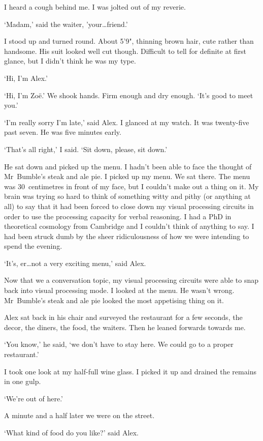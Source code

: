 I heard a cough behind me. I was jolted out of my reverie.

`Madam,' said the waiter, 'your\dots {\twelveit friend}.'

I stood up and turned round. About 5'9", thinning brown hair, cute
rather than handsome. His suit looked well cut though. Difficult to tell for definite at first glance, but I didn't think he was my type.

`Hi, I'm Alex.'

`Hi, I'm Zoë.' We shook hands. Firm enough and dry enough. `It's good to meet you.'

`I'm really sorry I'm late,' said Alex. I glanced at my watch. It was
twenty-five past seven. He was five minutes early.

`That's all right,' I said. `Sit down, please, sit down.'

He sat down and picked up the menu. I hadn't been able to face the thought of Mr~Bumble's steak
and ale pie. I picked up my menu. We sat there. The menu was 30~centimetres in front
of my face, but I couldn't make out a thing on it. My brain
was trying so hard to think of something witty and pithy (or anything at all) to say that it had been
forced to close down my visual processing circuits in order to use
the processing capacity for verbal reasoning. I had a PhD in theoretical cosmology from Cambridge
and I couldn't think of anything to say. I had been struck dumb by the sheer ridiculousness of how we were intending to spend the evening.

`It's, er\dots not a very exciting menu,' said Alex.

Now that we a conversation topic, my visual processing circuits
were able to snap back into visual processing mode. I looked at the menu. He
wasn't wrong. Mr~Bumble's steak and ale pie looked the most
appetising thing on it.

Alex sat back in his chair and surveyed the restaurant for a few
seconds, the decor, the diners, the food, the waiters. Then he
leaned forwards towards me.

`You know,' he said, `we don't have to stay here. We could go to a
proper restaurant.'

I took one look at my half-full wine glass. I picked it up and
drained the remains in one gulp.

`We're out of here.'

A minute and a half later we were on the street.

`What kind of food do you like?' said Alex.

